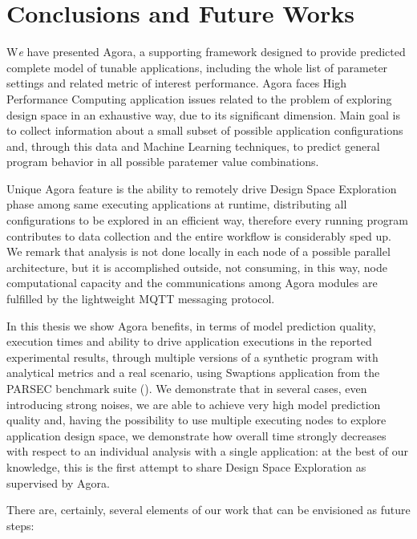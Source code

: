 \chapter{Conclusions and Future Works}\label{end}

\lettrine{W}{}\textit{e} have presented Agora, a supporting framework designed to provide predicted complete model of tunable applications, including the whole list of parameter settings and related metric of interest performance. Agora faces High Performance Computing application issues related to the problem of exploring design space in an exhaustive way, due to its significant dimension. Main goal is to collect information about a small subset of possible application configurations and, through this data and Machine Learning techniques, to predict general program behavior in all possible paratemer value combinations.

Unique Agora feature is the ability to remotely drive Design Space Exploration phase among same executing applications at runtime, distributing all configurations to be explored in an efficient way, therefore every running program contributes to data collection and the entire workflow is considerably sped up. We remark that analysis is not done locally in each node of a possible parallel architecture, but it is accomplished outside, not consuming, in this way, node computational capacity and the communications among Agora modules are fulfilled by the lightweight MQTT messaging protocol.

In this thesis we show Agora benefits, in terms of model prediction quality, execution times and ability to drive application executions in the reported experimental results, through multiple versions of a synthetic program with analytical metrics and a real scenario, using Swaptions application from the PARSEC benchmark suite (\cite{bienia2008parsec}). We demonstrate that in several cases, even introducing strong noises, we are able to achieve very high model prediction quality and, having the possibility to use multiple executing nodes to explore application design space, we demonstrate how overall time strongly decreases with respect to an individual analysis with a single application: at the best of our knowledge, this is the first attempt to share Design Space Exploration as supervised by Agora.

There are, certainly, several elements of our work that can be envisioned as future steps:

